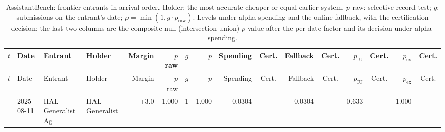 {\tiny\setlength{\tabcolsep}{1.5pt}
\begin{longtable}{rlllrrrrrcrcrcrc}
\caption{AssistantBench: frontier entrants in arrival order. Holder: the most accurate cheaper-or-equal earlier system. $p$ raw: selective record test; $g$: submissions on the entrant's date; $p = \min(1, g \cdot p_{\mathrm{raw}})$. Levels under alpha-spending and the online fallback, with the certification decision; the last two columns are the composite-null (intersection-union) $p$-value after the per-date factor and its decision under alpha-spending.}\label{tab:supp-cert-hal_assistantbench}\\
\toprule
$t$ & Date & Entrant & Holder & Margin & $p$ raw & $g$ & $p$ & Spending & Cert. & Fallback & Cert. & $p_{\mathrm{IU}}$ & Cert. & $p_{\mathrm{ex}}$ & Cert. \\
\midrule
\endfirsthead
\toprule
$t$ & Date & Entrant & Holder & Margin & $p$ raw & $g$ & $p$ & Spending & Cert. & Fallback & Cert. & $p_{\mathrm{IU}}$ & Cert. & $p_{\mathrm{ex}}$ & Cert. \\
\midrule
\endhead
\bottomrule
\endfoot
1 & 2025-08-11 & HAL Generalist Ag~ & HAL Generalist ~ & +3.0 & 1.000 & 1 & 1.000 & 0.0304 &  & 0.0304 &  & 0.633 &  & 1.000 &  \\
\end{longtable}

}
